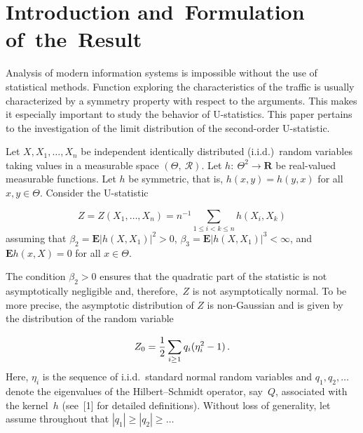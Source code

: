       \begin{multicols}{2}

            \label{st\stat}


\section{Introduction and~Formulation of~the~Result}

\noindent
Analysis of modern information systems is impossible without the use of statistical 
methods. Function exploring the characteristics of the traffic is usually characterized 
by a symmetry property with respect to the arguments. This makes it especially important 
to study the behavior of U-statistics. This paper pertains to the investigation of the 
limit distribution of the second-order U-statistic.

Let $X,X_1,\ldots ,X_n$ be independent identically distributed (i.i.d.)\
random variables taking values in a measurable space  $(\Theta, \
\mathcal{R})$. Let $h: \ \Theta^{2}\rightarrow\mathbf{R}$ be real-valued
measurable functions. Let $h$ be symmetric, that is,
$h(x,y)=h(y,x)$ for all $x,y\in\Theta$. Consider the \mbox{U-statistic}

\vspace*{2pt}

\noindent
\begin{equation}
\label{e1-y}
  Z=Z(X_1,\ldots ,X_n)=n^{-1} \sum\limits_{1\leq i<k\leq n}h(X_i,X_k)
\end{equation}
assuming that $ \beta_{2}=\mathbf{E}|h(X,X_1)|^{2}>0$, 
$\beta_{3}$\linebreak $=\mathbf{E}|h(X,X_1)|^{3} <\infty$, and 
$\mathbf{E}h(x,X)=0$ for all  $x \in\Theta$.

    The condition $\beta_{2}>0$ ensures
    that the quadratic part of the statistic is not asymptotically negligible and,
    therefore,~$Z$ is not asymptotically normal. To be more precise, the asymptotic distribution
    of $Z$ is non-Gaussian and is given by the distribution of the random variable
    
    \vspace*{2pt}
    
    \noindent
  \begin{equation*}
    Z_0=\displaystyle\frac{\displaystyle 1\mathstrut}{\displaystyle 2\mathstrut}\sum\limits_{i\geq 1}q_i(\eta_i^{2}-1)\,. 
    \end{equation*}
    Here, $\eta_i$ is the sequence of i.i.d.\ standard normal random variables and $q_1,q_2,\ldots$
    denote the eigenvalues of
    the Hilbert--Schmidt operator, say~$Q$, associated with the kernel~$h$ (see~[1] for
    detailed definitions). Without loss
    of generality, let assume throughout that $|q_1|\geq |q_2|\geq\ldots$


\end{multicols}
